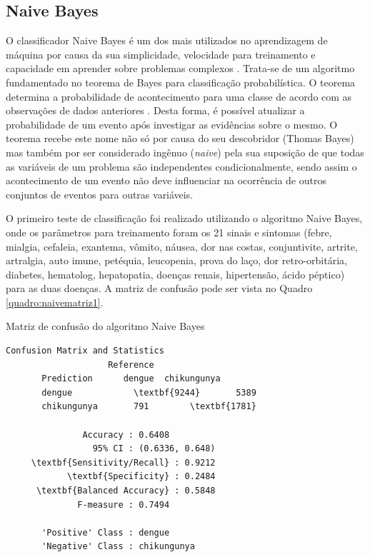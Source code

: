 \subsection{Naive Bayes}
O classificador Naive Bayes é um dos mais utilizados no aprendizagem de máquina por causa da sua simplicidade, velocidade para treinamento e capacidade em aprender sobre problemas complexos \cite{dong2014nonlinear,zhang2004optimality,chakrabarti2002mining}. Trata-se de um algoritmo fundamentado no teorema de Bayes para classificação probabilística. O teorema determina a probabilidade de acontecimento para uma classe de acordo com as observações de dados anteriores \cite{Aggarwal2015}. Desta forma, é possível atualizar a probabilidade de um evento após investigar as evidências sobre o mesmo. O teorema recebe este nome não só por causa do seu descobridor (Thomas Bayes) mas também por ser considerado ingênuo (\textit{naive}) pela sua suposição de que todas as variáveis de um problema são independentes condicionalmente, sendo assim o acontecimento de um evento não deve influenciar na ocorrência de outros conjuntos de eventos para outras variáveis.

O primeiro teste de classificação foi realizado utilizando o algoritmo Naive Bayes, onde os parâmetros para treinamento foram os 21 sinais e sintomas (febre, mialgia, cefaleia, exantema, vômito, náusea, dor nas costas, conjuntivite, artrite, artralgia, auto imune, petéquia, leucopenia, prova do laço, dor retro-orbitária, diabetes, hematolog, hepatopatia, doenças renais, hipertensão, ácido péptico) para as duas doenças. A matriz de confusão pode ser vista no Quadro \ref{quadro:naivematriz1}.

\begin{quadro}
\caption{\label{quadro:naivematriz1}Matriz de confusão do algoritmo Naive Bayes}
\begingroup
    \fontsize{10pt}{9pt}\selectfont
    \begin{Verbatim}[commandchars=\\\{\}]
      Confusion Matrix and Statistics
                    Reference
       Prediction      dengue  chikungunya
       dengue            \textbf{9244}       5389
       chikungunya       791        \textbf{1781}
                                         
               Accuracy : 0.6408         
                 95% CI : (0.6336, 0.648)
     \textbf{Sensitivity/Recall} : 0.9212         
            \textbf{Specificity} : 0.2484         
      \textbf{Balanced Accuracy} : 0.5848
              F-measure : 0.7494        
         
       'Positive' Class : dengue 
       'Negative' Class : chikungunya
  
    \end{Verbatim}  
\endgroup
{}
\end{quadro}
\newpage

